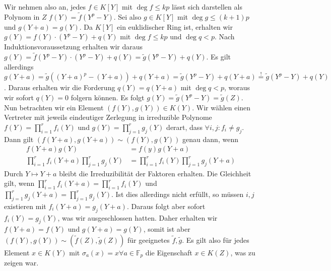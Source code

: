 \documentclass{article}
\begin{document}
\begin{enumerate}[(a)]
        Wir nehmen also an, jedes $f\in K[Y]$ mit $\deg f \leq kp$ lässt sich darstellen als Polynom in $Z$ $f(Y) = \tilde{f}(Y^p-Y)$.
        Sei also $g \in K[Y]$ mit $\deg g \leq (k+1)p$ und $g(Y + a) = g(Y)$. Da $K[Y]$ ein euklidischer Ring ist, erhalten wir
        $g(Y) = f(Y) \cdot (Y^p - Y) + q(Y)$ mit $\deg f \leq kp$ und $\deg q < p$. Nach Induktionsvoraussetzung erhalten wir daraus 
        $g(Y) = \tilde{f}(Y^p - Y) \cdot (Y^p - Y) + q(Y) = \tilde{g}(Y^p-Y) + q(Y)$. Es gilt allerdings 
        $g(Y + a) = \tilde{g}((Y + a)^p - (Y + a)) + q(Y + a) = \tilde{g}(Y^p - Y) + q(Y + a) \overset{!}{=} \tilde{g}(Y^p - Y) + q(Y)$.
        Daraus erhalten wir die Forderung $q(Y) = q(Y + a)$ mit $\deg q < p$, woraus wir sofort $q(Y) = 0$ folgern können.
        Es folgt $g(Y) = \tilde{g}(Y^p - Y) = \tilde{g}(Z)$.
        Nun betrachten wir ein Element $(f(Y), g(Y)) \in K(Y)$.
        Wir wählen einen Vertreter mit jeweils eindeutiger Zerlegung in irreduzible Polynome
        $f(Y) = \prod_{i = 1}^r f_i(Y)$ und $g(Y) = \prod_{j=1}^r g_j(Y)$ derart, dass $\forall i, j\colon f_i \neq g_j$.
        Dann gilt $(f(Y + a), g(Y + a)) \sim (f(Y), g(Y))$ genau dann, wenn
        \begin{align*}
            f(Y + a)g(Y) &= f(y)g(Y + a)\\
            \prod_{i = 1}^r f_i(Y+a)\prod_{j=1}^r g_j(Y)&= \prod_{i = 1}^r f_i(Y)\prod_{j=1}^r g_j(Y+a)
        \end{align*} 
        Durch $Y \mapsto Y + a$ bleibt die Irreduzibilität der Faktoren erhalten. 
        Die Gleichheit gilt, wenn $\prod_{i = 1}^r f_i(Y + a) = \prod_{i = 1}^r f_i(Y)$ und $\prod_{j=1}^r g_j(Y+a) = \prod_{j=1}^r g_j(Y)$.
        Ist dies allerdings nicht erfüllt, so müssen $i, j$ existieren mit $f_i(Y +a) = g_j(Y + a)$. 
        Daraus folgt aber sofort $f_i(Y) = g_j(Y)$, was wir ausgeschlossen hatten.
        Daher erhalten wir $f(Y + a) = f(Y)$ und $g(Y + a) = g(Y)$, somit ist aber $(f(Y), g(Y)) \sim (\tilde f(Z), \tilde g(Z))$ für geeignetes $\tilde f, \tilde g$.
        Es gilt also für jedes Element $x \in K(Y)$ mit $\sigma_a(x) = x\forall a \in \mathbb{F}_p$ die Eigenschaft $x\in K(Z)$, was zu zeigen war.
    \end{enumerate}
\end{document}
